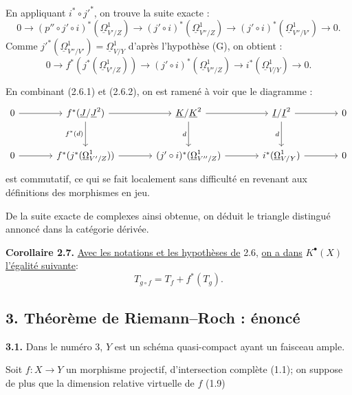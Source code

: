 
En
appliquant $i^*\circ j'^*$, on trouve la suite exacte :
\[
0\longrightarrow (p''\circ j'\circ i)^*(\underline{\Omega}^1_{V'/Z})\longrightarrow (j'\circ i)^*(\underline{\Omega}^1_{V''/Z})\longrightarrow (j'\circ i)^*(\underline{\Omega}^1_{V''/V'})\longrightarrow0.
\]
Comme $j'^*(\underline{\Omega}^1_{V''/V'})=\underline{\Omega}^1_{V/Y}$ d'après l'hypothèse (G), on obtient :
\begin{equation}\tag{2.6.2}
0\longrightarrow f^*(j^*(\underline{\Omega}^1_{V'/Z}))\longrightarrow (j'\circ i)^*(\underline{\Omega}^1_{V''/Z})\longrightarrow i^*(\underline{\Omega}^1_{V/Y})\longrightarrow0.
\end{equation}

En combinant (2.6.1) et (2.6.2), on est ramené à voir que le diagramme :
\[
\begin{tikzcd}[column sep=large,row sep=large]
0 \arrow[r] & f^*(\underline{J}/\underline{J}^2) \arrow[r] \arrow[d,"f^*(d)"'] & \underline{K}/\underline{K}^2 \arrow[r] \arrow[d,"d"'] & \underline{I}/\underline{I}^2 \arrow[r] \arrow[d,"d"'] & 0\\
0 \arrow[r] & f^*(j^*(\underline{\Omega}^1_{V'/Z})) \arrow[r] & (j'\circ i)^*(\underline{\Omega}^1_{V''/Z}) \arrow[r] & i^*(\underline{\Omega}^1_{V/Y}) \arrow[r] & 0
\end{tikzcd}
\]
est commutatif, ce qui se fait localement sans difficulté en revenant aux définitions des morphismes en jeu.

De la suite exacte de complexes ainsi obtenue, on déduit le triangle distingué annoncé dans la catégorie dérivée.

\textbf{Corollaire 2.7.} \uline{Avec les notations et les hypothèses de} 2.6, \uline{on a dans} $K^{\bullet}(X)$ \uline{l'égalité suivante}:
\[
T_{g\circ f}=T_f+f^*(T_g).
\]

\subsection*{3. Théorème de Riemann--Roch : énoncé}

\textbf{3.1.} Dans le numéro 3, $Y$ est un schéma quasi-compact ayant un faisceau ample.

Soit $f:X\to Y$ un morphisme projectif, d'intersection complète (1.1); on suppose de plus que la dimension relative virtuelle de $f$ (1.9)
